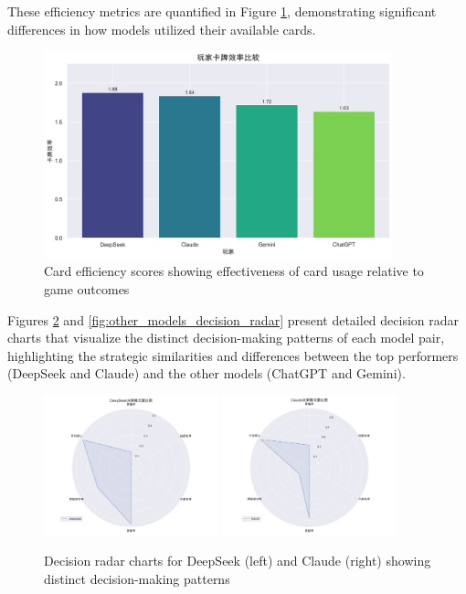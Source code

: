 \documentclass{article}
\begin{document}
These efficiency metrics are quantified in Figure \ref{fig:card_efficiency}, demonstrating significant differences in how models utilized their available cards.

\begin{figure}[H]
    \centering
    \includegraphics[width=0.9\textwidth]{figures/decision_card_efficiency.png}
    \caption{Card efficiency scores showing effectiveness of card usage relative to game outcomes}
    \label{fig:card_efficiency}
\end{figure}

Figures \ref{fig:top_models_decision_radar} and \ref{fig:other_models_decision_radar} present detailed decision radar charts that visualize the distinct decision-making patterns of each model pair, highlighting the strategic similarities and differences between the top performers (DeepSeek and Claude) and the other models (ChatGPT and Gemini).

\begin{figure}[H]
    \centering
    \includegraphics[width=0.45\textwidth]{figures/DeepSeek_decision_radar.png}
    \includegraphics[width=0.45\textwidth]{figures/Claude_decision_radar.png}
    \caption{Decision radar charts for DeepSeek (left) and Claude (right) showing distinct decision-making patterns}
    \label{fig:top_models_decision_radar}
\end{figure}
\end{document}
